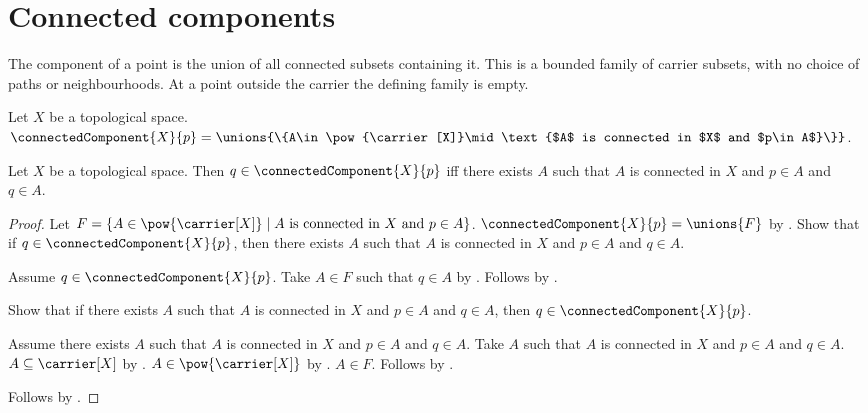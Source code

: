 \section{Connected components}




The component of a point is the union of all connected subsets containing
it. This is a bounded family of carrier subsets, with no choice of paths
or neighbourhoods. At a point outside the carrier the defining family is empty.

\begin{definition}\label{connected_component}
    Let $X$ be a topological space.
    $\connectedComponent{X}{p}=\unions{\{A\in\pow{\carrier[X]}\mid
        \text{$A$ is connected in $X$ and $p\in A$}\}}$.
\end{definition}

\begin{theorem}\label{connected_component_member_iff}
    Let $X$ be a topological space.
    Then $q\in\connectedComponent{X}{p}$ iff there exists $A$ such that
        $A$ is connected in $X$ and $p\in A$ and $q\in A$.
\end{theorem}
\begin{proof}
    Let $F=\{A\in\pow{\carrier[X]}\mid\text{$A$ is connected in $X$ and $p\in A$}\}$.
    $\connectedComponent{X}{p}=\unions{F}$ by .
    Show that if $q\in\connectedComponent{X}{p}$, then there exists $A$ such that
        $A$ is connected in $X$ and $p\in A$ and $q\in A$.
    \begin{subproof}
        Assume $q\in\connectedComponent{X}{p}$.
        Take $A\in F$ such that $q\in A$ by .
        Follows by \auto.
    \end{subproof}
    Show that if there exists $A$ such that $A$ is connected in $X$ and
        $p\in A$ and $q\in A$, then $q\in\connectedComponent{X}{p}$.
    \begin{subproof}
        Assume there exists $A$ such that $A$ is connected in $X$ and $p\in A$ and $q\in A$.
        Take $A$ such that $A$ is connected in $X$ and $p\in A$ and $q\in A$.
        $A\subseteq\carrier[X]$ by .
        $A\in\pow{\carrier[X]}$ by .
        $A\in F$.
        Follows by .
    \end{subproof}
    Follows by \auto.
\end{proof}

